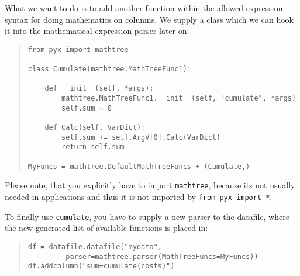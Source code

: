 What we want to do is to add another function within the allowed
expression syntax for doing mathematics on columns. We supply a class
which we can hook it into the mathematical expression parser later on:

\begin{quote}
\begin{verbatim}
from pyx import mathtree

class Cumulate(mathtree.MathTreeFunc1):

    def __init__(self, *args):
        mathtree.MathTreeFunc1.__init__(self, "cumulate", *args)
        self.sum = 0

    def Calc(self, VarDict):
        self.sum += self.ArgV[0].Calc(VarDict)
        return self.sum

MyFuncs = mathtree.DefaultMathTreeFuncs + (Cumulate,)
\end{verbatim}
\end{quote}

Please note, that you explicitly have to import \verb|mathtree|,
because its not usually needed in \PyX{} applications and thus it is
not imported by \verb|from pyx import *|.

To finally use \verb|cumulate|, you have to supply a new parser to the
datafile, where the new generated list of available functions is
placed in:

\begin{quote}
\begin{verbatim}
df = datafile.datafile("mydata",
         parser=mathtree.parser(MathTreeFuncs=MyFuncs))
df.addcolumn("sum=cumulate(costs)")
\end{verbatim}
\end{quote}

